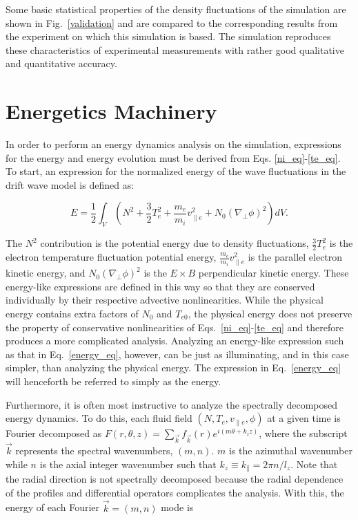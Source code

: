 \documentclass[showpacs,preprintnumbers,amsmath,amssymb,superscriptaddress,aip]{revtex4-1}
\def\beq{\begin{equation}}
\def\eeq{\end{equation}}
\def\para{\parallel}
\def\grad{\nabla}
\newcommand{\gradperp}{\grad_\perp}
\newcommand{\vpe}{v_{\parallel e}}
\begin{document}
Some basic statistical properties of the density fluctuations of the
simulation are shown in Fig.~\ref{validation} and are  compared to the corresponding results from the experiment on which
this simulation is based. The simulation reproduces these characteristics of experimental measurements with rather good qualitative and quantitative accuracy.

\section{Energetics Machinery}
\label{sec_energetics_machinery}

In order to perform an energy dynamics analysis on the simulation, expressions for the energy and energy evolution must be derived from Eqs. \ref{ni_eq}-\ref{te_eq}.
To start, an expression for the normalized energy of the wave fluctuations in the drift wave model is defined as:

\beq
\label{energy_eq}
E = \frac{1}{2} \int_V  (N^2 + \frac{3}{2} T_e^2 + \frac{m_e}{m_i} \vpe^2 + N_0 (\gradperp \phi)^2 ) dV.
\eeq

The $N^2$ contribution is the potential energy due to density fluctuations, $\frac{3}{2} T_e^2$ is the electron temperature fluctuation potential energy,
$\frac{m_e}{m_i} \vpe^2$ is the parallel electron kinetic energy, and $N_0 (\gradperp \phi)^2$ is the $E \times B$ perpendicular kinetic energy.
These energy-like expressions are defined in this way so that they are conserved individually by their respective advective nonlinearities. While the physical energy contains
extra factors of $N_0$ and $T_{e0}$, the physical energy does not preserve the property of conservative nonlinearities of Eqs.~\ref{ni_eq}-\ref{te_eq} and therefore produces
a more complicated analysis. Analyzing an energy-like expression such as that in Eq.~\ref{energy_eq}, however, can be just as illuminating, and in this case simpler,
than analyzing the physical energy.
The expression in Eq.~\ref{energy_eq} will henceforth be referred to simply as the energy.

Furthermore, it is often most instructive to analyze the spectrally decomposed energy dynamics. 
To do this, each fluid field $(N,T_e,\vpe,\phi)$ at a given time is Fourier decomposed as 
$F(r,\theta,z) = \sum_{\vec{k}} f_{\vec{k}}(r) e^{i (m \theta + k_z z )}$,
where the subscript $\vec{k}$ represents the spectral wavenumbers, $(m,n)$. 
$m$ is the azimuthal wavenumber while $n$ is the axial integer wavenumber such that $k_z \equiv k_\para = 2 \pi n/l_z$. 
Note that the radial direction is not spectrally decomposed because the radial dependence of the profiles and differential operators complicates the analysis.
With this, the energy of each Fourier $\vec{k} = (m,n)$ mode is
\end{document}
